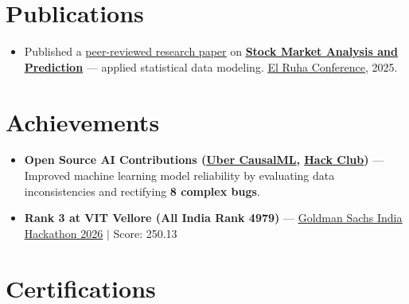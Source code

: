 \documentclass[a4paper,10pt]{article}
\newcommand{\ulink}[2]{\href{#1}{\uline{#2}}}
\begin{document}
\vspace{2pt}

\section{Publications}
\vspace{2pt}
\begin{itemize}[nosep, leftmargin=1.5em, itemsep=1pt, topsep=2pt]
  \item {\color[HTML]{0A0A0A}\fontsize{11}{14}\selectfont
  Published a \ulink{https://www.elruha.org/_files/ugd/614b1f_6b95e1b697bf452b9907ba46e0151c05.pdf\#page=774}{peer-reviewed research paper} on \ulink{https://github.com/su-jin1425/Set-Project}{\textbf{Stock Market Analysis and Prediction}} --- applied statistical data modeling. \ulink{https://www.elruha.org/congress-books}{El Ruha Conference}, 2025.}
\end{itemize}

\vspace{2pt}

\section{Achievements}
\vspace{2pt}
\begin{itemize}[nosep, leftmargin=1.5em, itemsep=1pt, topsep=2pt]
  \item {\color[HTML]{0A0A0A}\fontsize{11}{14}\selectfont \textbf{Open Source AI Contributions (\ulink{https://github.com/uber/causalml}{Uber CausalML}, \ulink{https://github.com/hackclub/stardance}{Hack Club})} --- Improved machine learning model reliability by evaluating data inconsistencies and rectifying \textbf{8 complex bugs}.}
  \item {\color[HTML]{0A0A0A}\fontsize{11}{14}\selectfont \textbf{Rank 3 at VIT Vellore (All India Rank 4979)} --- \ulink{https://www.hackerrank.com/contests/goldman-sachs-india-hackathon-2026-cs/leaderboard}{Goldman Sachs India Hackathon 2026} $|$ Score: 250.13}
\end{itemize}

\vspace{2pt}

\section{Certifications}
\vspace{2pt}
\end{document}
